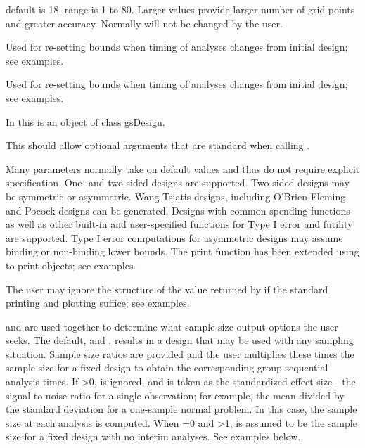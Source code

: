 \begin{Arguments}
\begin{ldescription}
default is 18, range is 1 to 80. 
Larger values provide larger number of grid points and greater accuracy.
Normally  will not be changed by the user.
\item[\code{n.I}] Used for re-setting bounds when timing of analyses changes from initial design; see examples.
\item[\code{maxn.IPlan}] Used for re-setting bounds when timing of analyses changes from initial design; see examples.
\item[\code{x}] In  this is an object of class gsDesign.
\item[\code{...}] This should allow optional arguments that are standard when calling .
\end{ldescription}
\end{Arguments}
\begin{Details}\relax
Many parameters normally take on default values and thus do not require explicit specification.
One- and two-sided designs are supported. Two-sided designs may be symmetric or asymmetric.
Wang-Tsiatis designs, including O'Brien-Fleming and Pocock designs can be generated.
Designs with common spending functions as well as other built-in and user-specified functions for Type I error and 
futility are supported.
Type I error computations for asymmetric designs may assume binding or non-binding lower bounds.
The print function has been extended using  to print  objects; see examples.

The user may ignore the structure of the value returned by  if the standard
printing and plotting suffice; see examples.

 and  are used together to determine what sample size output options the user seeks.
The default,  and , results in a  design that may be used with any sampling
situation. Sample size ratios are provided and the user multiplies these times the sample size for a fixed design
to obtain the corresponding group sequential analysis times. If >0,  is ignored, and 
 is taken as the standardized effect size - the signal to noise ratio for a single observation;
for example, the mean divided by the standard deviation for a one-sample normal problem. 
In this case, the sample size at each analysis is computed. 
When =0 and >1,  is assumed to be the sample size for a fixed design
with no interim analyses. See examples below. 


\end{Details}
